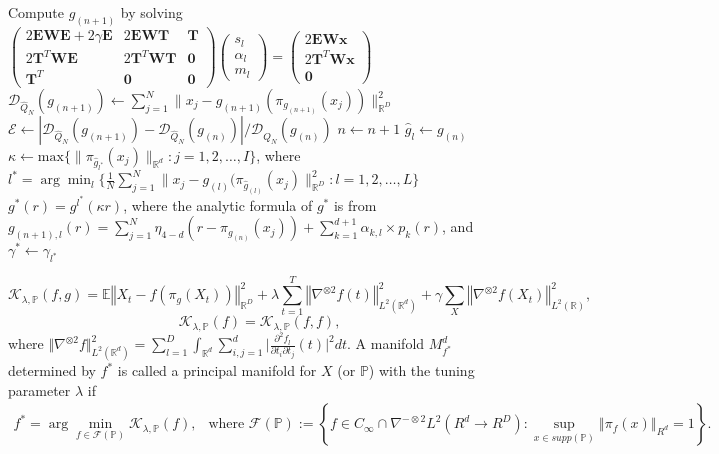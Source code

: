 \documentclass[11pt,reqno]{article}
\begin{document}
\begin{algorithm}
{{        Compute $g_{(n + 1)}$ by solving $\left(\begin{array}{ccc} 
        2\mathbf{E}\mathbf{W}\mathbf{E} + 2\gamma\mathbf{E} & 2\mathbf{E}\mathbf{W}\mathbf{T} & \mathbf{T} \\
        2\mathbf{T}^T\mathbf{W}\mathbf{E} & 2\mathbf{T}^T\mathbf{W}\mathbf{T} & \mathbf{0} \\
        \mathbf{T}^T & \mathbf{0} & \mathbf{0} \end{array}\right)\left(\begin{array}{c} 
        s_l \\
        \alpha_l \\
        m_l 
        \end{array}\right) = \left(\begin{array}{c}
        2\mathbf{E}\mathbf{W}\mathbf{x} \\
        2\mathbf{T}^T\mathbf{W}\mathbf{x} \\
        \mathbf{0} 
        \end{array}\right)$\;
        $\mathcal{D}_{\hat{Q}_N}(g_{(n + 1)}) \gets \sum_{j=1}^N\|x_j - g_{(n + 1)}(\pi_{g_{(n + 1)}}(x_j))\|_{\mathbb{R}^D}^2$\;
        $\mathcal{E} \gets |\mathcal{D}_{\hat{Q}_N}(g_{(n + 1)}) - \mathcal{D}_{\hat{Q}_N}(g_{(n)})|/\mathcal{D}_{\hat{Q}_N}(g_{(n)})$\;
        $n \gets n + 1$\;
    }
    $\hat{g}_l \gets g_{(n)}$\;
}
$\kappa \gets \text{max}\{\|\pi_{\hat{g}_{l^*}}(x_j)\|_{\mathbb{R}^d}: j = 1, 2, \dots, I\}$, where $l^* = \arg \min_l\{\frac{1}{N}\sum_{j=1}^N\|x_j - g_{(l)}(\pi_{\hat{g}_{(l)}}(x_j)\|_{\mathbb{R}^D}^2: l = 1, 2, \dots, L\}$\;
$g^*(r) = g^{l^*}(\kappa r)$, where the analytic formula of $g^*$ is from $g_{(n + 1), l}(r) = \sum_{j=1}^N \eta_{4-d}(r - \pi_{g_{(n)}}(x_j)) + \sum_{k=1}^{d + 1} \alpha_{k, l} \times p_k(r)$, and $\gamma^* \gets \gamma_{l^*}$
\end{algorithm}

	\begin{equation}\label{PMSEF}
	\mathcal{K}_{\lambda,\mathbb{P}}(f,g)=\mathbb{E}\left\Vert X_t - f\left(\pi_g(X_t)\right)\right\Vert^2_{\mathbb{R}^D} + \lambda \sum_{t = 1}^T \left\Vert\nabla^{\otimes 2} f(t)\right\Vert_{L^2(\mathbb{R}^d)}^2 + \gamma \sum_{X} \left\Vert\nabla^{\otimes 2} f(X_t)\right\Vert_{L^2(\mathbb{R})}^2, 
	\end{equation}
	\begin{equation}\nonumber
	\mathcal{K}_{\lambda,\mathbb{P}}(f)=\mathcal{K}_{\lambda,\mathbb{P}}(f,f),
	\end{equation}
	where $\Vert\nabla^{\otimes 2}f \Vert_{L^2(\mathbb{R}^d)}^2 = \sum_{l=1}^D\int_{\mathbb{R}^d} \sum_{i,j=1}^d\vert\frac{\partial^2 f_l}{\partial t_i \partial t_j}(t)\vert^2dt$. A manifold $M_{f^*}^d$ determined by $f^*$ is called a principal manifold for $X$ (or $\mathbb{P}$) with the tuning parameter $\lambda$ if 
	\begin{align}\label{def: PM}
	f^*=\arg\min_{f\in\mathscr{F}(\mathbb{P})}\mathcal{K}_{\lambda,\mathbb{P}}(f),\ \ \mbox{ where }\mathscr{F}(\mathbb{P}):=\left\{f\in C_\infty\cap \nabla^{-\otimes 2}L^2( R^d \rightarrow R^D):\sup_{x\in supp(\mathbb{P})}\left\Vert\pi_f(x)\right\Vert_{R^d} = 1 \right\}.
	\end{align}
\end{document}

